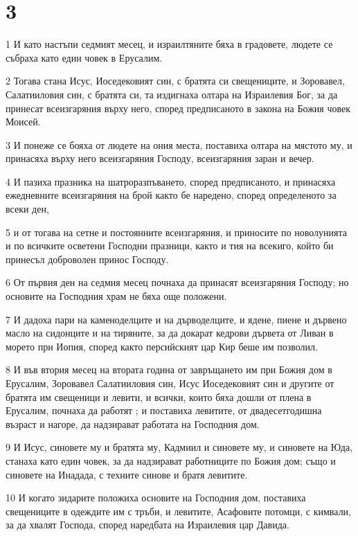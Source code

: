 \chapter{3}

\par 1 И като настъпи седмият месец, и израилтяните бяха в градовете, людете се събраха като един човек в Ерусалим.
\par 2 Тогава стана Исус, Иоседековият син, с братята си свещениците, и Зоровавел, Салатииловия син, с братята си, та издигнаха олтара на Израилевия Бог, за да принесат всеизгаряния върху него, според предписаното в закона на Божия човек Моисей.
\par 3 И понеже се бояха от людете на ония места, поставиха олтара на мястото му, и принасяха върху него всеизгаряния Господу, всеизгаряния заран и вечер.
\par 4 И пазиха празника на шатроразпъването, според предписаното, и принасяха ежедневните всеизгаряния на брой както бе наредено, според определеното за всеки ден,
\par 5 и от тогава на сетне и постоянните всеизгаряния, и приносите по новолунията и по всичките осветени Господни празници, както и тия на всекиго, който би принесъл доброволен принос Господу.
\par 6 От първия ден на седмия месец почнаха да принасят всеизгаряния Господу; но основите на Господния храм не бяха още положени.
\par 7 И дадоха пари на каменоделците и на дърводелците, и ядене, пиене и дървено масло на сидонците и на тиряните, за да докарат кедрови дървета от Ливан в морето при Иопия, според както персийският цар Кир беше им позволил.
\par 8 И във втория месец на втората година от завръщането им при Божия дом в Ерусалим, Зоровавел Салатииловия син, Исус Иоседековият син и другите от братята им свещеници и левити, и всички, които бяха дошли от плена в Ерусалим, почнаха да работят ; и поставиха левитите, от двадесетгодишна възраст и нагоре, да надзирават работата на Господния дом.
\par 9 И Исус, синовете му и братята му, Кадмиил и синовете му, и синовете на Юда, станаха като един човек, за да надзирават работниците по Божия дом; също и синовете на Инадада, с техните синове и братя левитите.
\par 10 И когато зидарите положиха основите на Господния дом, поставиха свещениците в одеждите им с тръби, и левитите, Асафовите потомци, с кимвали, за да хвалят Господа, според наредбата на Израилевия цар Давида.
